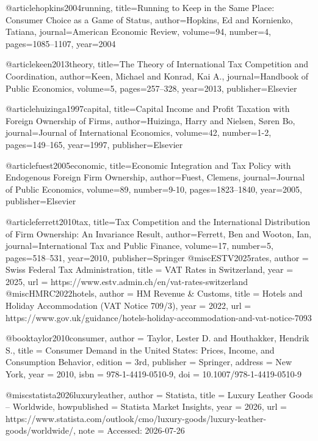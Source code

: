 @article{hopkins2004running,
  title={Running to Keep in the Same Place: Consumer Choice as a Game of Status},
  author={Hopkins, Ed and Kornienko, Tatiana},
  journal={American Economic Review},
  volume={94},
  number={4},
  pages={1085--1107},
  year={2004}
}

@article{keen2013theory,
  title={The Theory of International Tax Competition and Coordination},
  author={Keen, Michael and Konrad, Kai A.},
  journal={Handbook of Public Economics},
  volume={5},
  pages={257--328},
  year={2013},
  publisher={Elsevier}
}

@article{huizinga1997capital,
  title={Capital Income and Profit Taxation with Foreign Ownership of Firms},
  author={Huizinga, Harry and Nielsen, Søren Bo},
  journal={Journal of International Economics},
  volume={42},
  number={1-2},
  pages={149--165},
  year={1997},
  publisher={Elsevier}
}

@article{fuest2005economic,
  title={Economic Integration and Tax Policy with Endogenous Foreign Firm Ownership},
  author={Fuest, Clemens},
  journal={Journal of Public Economics},
  volume={89},
  number={9-10},
  pages={1823--1840},
  year={2005},
  publisher={Elsevier}
}

@article{ferrett2010tax,
  title={Tax Competition and the International Distribution of Firm Ownership: An Invariance Result},
  author={Ferrett, Ben and Wooton, Ian},
  journal={International Tax and Public Finance},
  volume={17},
  number={5},
  pages={518--531},
  year={2010},
  publisher={Springer}
}
@misc{ESTV2025rates,
  author = {{Swiss Federal Tax Administration}},
  title  = {VAT Rates in Switzerland},
  year   = {2025},
  url    = {https://www.estv.admin.ch/en/vat-rates-switzerland}
}
@misc{HMRC2022hotels,
  author = {{HM Revenue \& Customs}},
  title  = {Hotels and Holiday Accommodation ({VAT} Notice 709/3)},
  year   = {2022},
  url    = {https://www.gov.uk/guidance/hotels-holiday-accommodation-and-vat-notice-7093}
}

@book{taylor2010consumer,
  author    = {Taylor, Lester D. and Houthakker, Hendrik S.},
  title     = {Consumer Demand in the United States: Prices, Income, and Consumption Behavior},
  edition   = {3rd},
  publisher = {Springer},
  address   = {New York},
  year      = {2010},
  isbn      = {978-1-4419-0510-9},
  doi       = {10.1007/978-1-4419-0510-9}
}

@misc{statista2026luxuryleather,
  author       = {{Statista}},
  title        = {Luxury Leather Goods -- Worldwide},
  howpublished = {Statista Market Insights},
  year         = {2026},
  url          = {https://www.statista.com/outlook/cmo/luxury-goods/luxury-leather-goods/worldwide/},
  note         = {Accessed: 2026-07-26}
}

